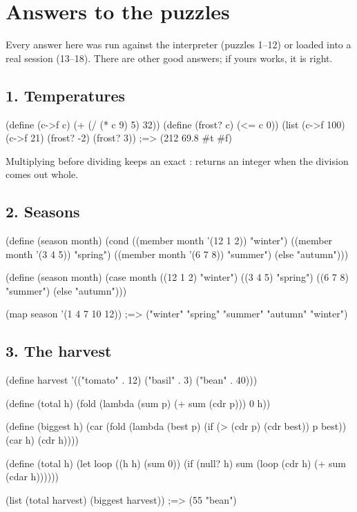 \chapter{Answers to the puzzles}
\label{app:answers}

Every answer here was run against the interpreter (puzzles 1--12) or loaded
into a real session (13--18). There are other good answers; if yours
works, it is right.

\section*{1. Temperatures}

\begin{scm}
(define (c->f c) (+ (/ (* c 9) 5) 32))
(define (frost? c) (<= c 0))
(list (c->f 100) (c->f 21) (frost? -2) (frost? 3))   ;=> (212 69.8 #t #f)
\end{scm}

Multiplying before dividing keeps  an exact :
\code{/} returns an integer when the division comes out whole.

\section*{2. Seasons}

\begin{scm}
(define (season month)
  (cond ((member month '(12 1 2)) "winter")
        ((member month '(3 4 5)) "spring")
        ((member month '(6 7 8)) "summer")
        (else "autumn")))

(define (season month)
  (case month
    ((12 1 2) "winter")
    ((3 4 5) "spring")
    ((6 7 8) "summer")
    (else "autumn")))

(map season '(1 4 7 10 12))   ;=> ("winter" "spring" "summer" "autumn" "winter")
\end{scm}

\section*{3. The harvest}

\begin{scm}
(define harvest '(("tomato" . 12) ("basil" . 3) ("bean" . 40)))

(define (total h) (fold (lambda (sum p) (+ sum (cdr p))) 0 h))

(define (biggest h)
  (car (fold (lambda (best p) (if (> (cdr p) (cdr best)) p best))
             (car h) (cdr h))))

(define (total h)
  (let loop ((h h) (sum 0))
    (if (null? h) sum (loop (cdr h) (+ sum (cdar h))))))

(list (total harvest) (biggest harvest))   ;=> (55 "bean")
\end{scm}

